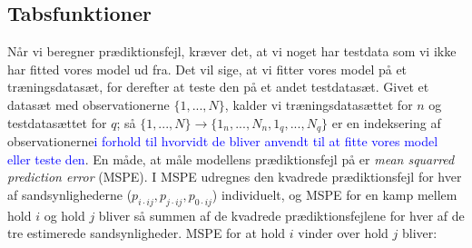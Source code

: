 \documentclass[11pt,a4paper]{article}
\begin{document}
\subsection{Tabsfunktioner}
Når vi beregner prædiktionsfejl, kræver det, at vi noget har testdata som vi ikke har fitted vores model ud fra. Det vil sige, at vi fitter vores model på et træningsdatasæt, for derefter at teste den på et andet testdatasæt. Givet et datasæt med observationerne $\{1,...,N\}$, kalder vi træningsdatasættet for $n$ og testdatasættet for $q$; så $\{1,...,N\}\rightarrow\{1_n,...,N_n,1_q,...,N_q\}$ er en indeksering af observationerne\textcolor{blue}{i forhold til hvorvidt de bliver anvendt til at fitte vores model eller teste den}. En måde, at måle modellens prædiktionsfejl på er \textit{mean squarred prediction error} (MSPE). I MSPE udregnes den kvadrede prædiktionsfejl for hver af sandsynlighederne ($p_{i\cdot ij}, p_{j\cdot ij}, p_{0\cdot ij}$) individuelt, og MSPE for en kamp mellem hold $i$ og hold $j$ bliver så summen af de kvadrede prædiktionsfejlene for hver af de tre estimerede sandsynligheder. MSPE for at hold $i$ vinder over hold $j$ bliver:
\end{document}
